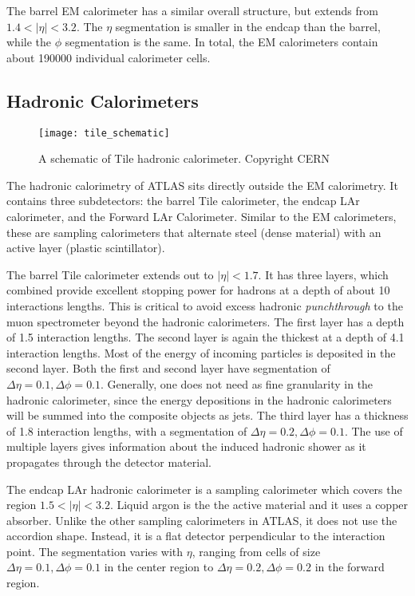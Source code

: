 The barrel EM calorimeter has a similar overall structure, but extends from $1.4 < |\eta| < 3.2$.
The $\eta$ segmentation is smaller in the endcap than the barrel, while the $\phi$ segmentation is the same.
In total, the EM calorimeters contain about 190000 individual calorimeter cells.


\subsection{Hadronic Calorimeters}
\begin{figure}[tbp]
\caption{A schematic of Tile hadronic calorimeter. Copyright CERN} \label{fig:tile_schematic}
\texttt{[image: tile\_schematic]}
\end{figure}

The hadronic calorimetry of ATLAS sits directly outside the EM calorimetry.
It contains three subdetectors: the barrel Tile calorimeter, the endcap LAr calorimeter, and the Forward  LAr Calorimeter.
Similar to the EM calorimeters, these are sampling calorimeters that alternate steel (dense material) with an active layer (plastic scintillator).

The barrel Tile calorimeter extends out to $|\eta| < 1.7$.
It has three layers, which combined provide excellent stopping power for hadrons at a depth of about 10 interactions lengths.
This is critical to avoid excess hadronic \textit{punchthrough} to the muon spectrometer beyond the hadronic calorimeters.
The first layer has a depth of 1.5 interaction lengths.
The second layer is again the thickest at a depth of 4.1 interaction lengths.
Most of the energy of incoming particles is deposited in the second layer.
Both the first and second layer have segmentation of $\Delta\eta = 0.1, \Delta\phi = 0.1$.
Generally, one does not need as fine granularity in the hadronic calorimeter, since the energy depositions in the hadronic calorimeters will be summed into the composite objects as jets.
The third layer has a thickness of 1.8 interaction lengths, with a segmentation of $\Delta\eta = 0.2, \Delta\phi = 0.1$.
The use of multiple layers gives information about the induced hadronic shower as it propagates through the detector material.

The endcap LAr hadronic calorimeter is a sampling calorimeter which covers the region $1.5 < |\eta| < 3.2$.
Liquid argon is the the active material and it uses a copper absorber.
Unlike the other sampling calorimeters in ATLAS, it does not use the accordion shape.
Instead, it is a flat detector perpendicular to the interaction point.
The segmentation varies with $\eta$, ranging from cells of size $\Delta\eta = 0.1, \Delta\phi = 0.1$ in the center region to $\Delta\eta = 0.2, \Delta\phi = 0.2$ in the forward region.

